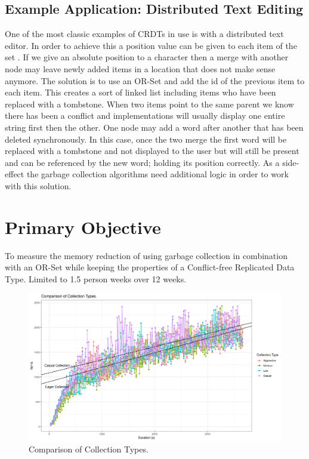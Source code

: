 \documentclass{article}
\begin{document}
\begin{multicols}{2}
\begin{refsection}
\subsection*{Example Application: Distributed Text Editing}

One of the most classic examples of CRDTs in use is with a distributed
text editor. In order to achieve this a position value can be given to
each item of the set \cite{kleppmann_conflict-free_2017}. If we give an
absolute position to a character then a merge with another node may
leave newly added items in a location that does not make sense anymore.
The solution is to use an OR-Set and add the id of the previous item to
each item. This creates a sort of linked list including items who have
been replaced with a tombstone. When two items point to the same parent
we know there has been a conflict and implementations will usually
display one entire string first then the other. One node may add a word
after another that has been deleted synchronously. In this case, once
the two merge the first word will be replaced with a tombstone and not
displayed to the user but will still be present and can be referenced
by the new word; holding its position correctly. As a side-effect the
garbage collection algorithms need additional logic in order to work
with this solution.

\section*{Primary Objective}

To measure the memory reduction of using garbage collection in
combination with an OR-Set while keeping the properties of a
Conflict-free Replicated Data Type. Limited to 1.5 person weeks over
12 weeks.

\begin{figure}[t]
\includegraphics[width=\textwidth]{CollectionType3_1}
\centering
\caption{Comparison of Collection Types.}
\label{fig:figureB}
\end{figure}


\end{refsection}
\end{multicols}
\end{document}
